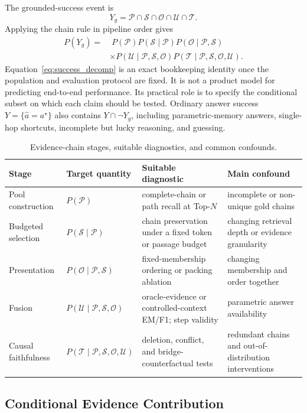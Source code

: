 \documentclass[manuscript,review]{acmart}
\newcommand{\obs}{\ensuremath{\mathcal{P}}}
\newcommand{\sel}{\ensuremath{\mathcal{S}}}
\newcommand{\expo}{\ensuremath{\mathcal{O}}}
\newcommand{\fus}{\ensuremath{\mathcal{U}}}
\newcommand{\faith}{\ensuremath{\mathcal{T}}}
\theoremstyle{definition}
\theoremstyle{plain}
\theoremstyle{remark}
\begin{document}
The grounded-success event is
\begin{equation}
Y_g=\obs\cap\sel\cap\expo\cap\fus\cap\faith.
\end{equation}
Applying the chain rule in pipeline order gives
\begin{align}
P(Y_g)=&\;P(\obs)P(\sel\mid\obs)
P(\expo\mid\obs,\sel) \\
&\times P(\fus\mid\obs,\sel,\expo)
P(\faith\mid\obs,\sel,\expo,\fus).
\label{eq:success_decomp}
\end{align}
Equation~\ref{eq:success_decomp} is an exact bookkeeping identity once the
population and evaluation protocol are fixed. It is not a product model for
predicting end-to-end performance. Its practical role is to specify the
conditional subset on which each claim should be tested. Ordinary answer
success $Y=\{\hat a=a^\star\}$ also contains $Y\cap\neg Y_g$, including
parametric-memory answers, single-hop shortcuts, incomplete but lucky
reasoning, and guessing.

\begin{table}[t]
\caption{Evidence-chain stages, suitable diagnostics, and common confounds.}
\label{tab:diagnostic_protocol}
\centering
\small
\begin{tabularx}{\linewidth}{@{}p{2.4cm}p{3.1cm}p{3.1cm}Y@{}}
\toprule
Stage & Target quantity & Suitable diagnostic & Main confound \\
\midrule
Pool construction & $P(\obs)$ & complete-chain or path recall at Top-$N$ & incomplete or non-unique gold chains \\
Budgeted selection & $P(\sel\mid\obs)$ & chain preservation under a fixed token or passage budget & changing retrieval depth or evidence granularity \\
Presentation & $P(\expo\mid\obs,\sel)$ & fixed-membership ordering or packing ablation & changing membership and order together \\
Fusion & $P(\fus\mid\obs,\sel,\expo)$ & oracle-evidence or controlled-context EM/F1; step validity & parametric answer availability \\
Causal faithfulness & $P(\faith\mid\obs,\sel,\expo,\fus)$ & deletion, conflict, and bridge-counterfactual tests & redundant chains and out-of-distribution interventions \\
\bottomrule
\end{tabularx}
\end{table}

\subsection{Conditional Evidence Contribution}
\label{subsec:conditional_utility}
\end{document}

